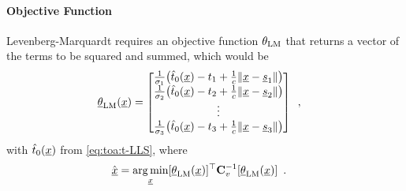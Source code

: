 \documentclass[conference]{IEEEtran}
\begin{document}
%
%
\paragraph*{Objective Function}
Levenberg-Marquardt requires an objective function $\theta_{\op{LM}}$ that returns a vector of the terms to be squared and summed, which would be 
\begin{align}
    \vec \theta_{\op{LM}}(\x) &= \begin{bmatrix}
        \frac{1}{\sigma_1}\paren{\hat t_0(\x) - t_1 + \frac{1}{c}\abss{\x-\s_1} } \\
        \frac{1}{\sigma_2}\paren{\hat t_0(\x) - t_2 + \frac{1}{c}\abss{\x-\s_2} } \\
        \vdots \\ 
        \frac{1}{\sigma_3}\paren{\hat t_0(\x) - t_3 + \frac{1}{c}\abss{\x-\s_3} } 
    \end{bmatrix} \enspace, \label{eq:toa:obj-LM}
\end{align}
with $\hat t_0({\underline{x}})$ from \cref{eq:toa:t-LLS}, where 
\begin{align}
    \hat \x &= \argmin_\x \brackets{\vec \theta_{\op{LM}}(\x)}\T \mat C_v^{-1} \brackets{\vec \theta_{\op{LM}}(\x)} \enspace. \label{eq:TOA-LM:sol}
\end{align}

%
%
\end{document}
